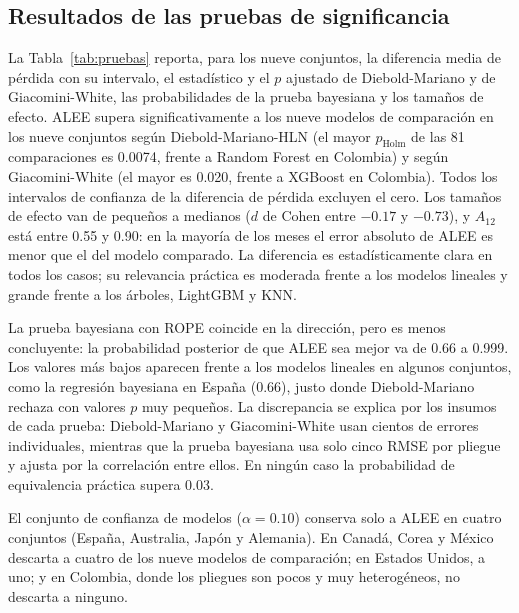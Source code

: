 \documentclass[11pt]{article}
\begin{document}
\FloatBarrier
\subsection{Resultados de las pruebas de significancia}

La Tabla~\ref{tab:pruebas} reporta, para los nueve conjuntos, la diferencia media de pérdida con su intervalo, el estadístico y el $p$ ajustado de Diebold-Mariano y de Giacomini-White, las probabilidades de la prueba bayesiana y los tamaños de efecto. ALEE supera significativamente a los nueve modelos de comparación en los nueve conjuntos según Diebold-Mariano-HLN (el mayor $p_{\mathrm{Holm}}$ de las 81 comparaciones es 0.0074, frente a Random Forest en Colombia) y según Giacomini-White (el mayor es 0.020, frente a XGBoost en Colombia). Todos los intervalos de confianza de la diferencia de pérdida excluyen el cero. Los tamaños de efecto van de pequeños a medianos ($d$ de Cohen entre $-0.17$ y $-0.73$), y $A_{12}$ está entre 0.55 y 0.90: en la mayoría de los meses el error absoluto de ALEE es menor que el del modelo comparado. La diferencia es estadísticamente clara en todos los casos; su relevancia práctica es moderada frente a los modelos lineales y grande frente a los árboles, LightGBM y KNN.

{\tiny\setlength{\tabcolsep}{2pt}

}

La prueba bayesiana con ROPE coincide en la dirección, pero es menos concluyente: la probabilidad posterior de que ALEE sea mejor va de 0.66 a 0.999. Los valores más bajos aparecen frente a los modelos lineales en algunos conjuntos, como la regresión bayesiana en España (0.66), justo donde Diebold-Mariano rechaza con valores $p$ muy pequeños. La discrepancia se explica por los insumos de cada prueba: Diebold-Mariano y Giacomini-White usan cientos de errores individuales, mientras que la prueba bayesiana usa solo cinco RMSE por pliegue y ajusta por la correlación entre ellos. En ningún caso la probabilidad de equivalencia práctica supera 0.03.

El conjunto de confianza de modelos ($\alpha=0.10$) conserva solo a ALEE en cuatro conjuntos (España, Australia, Japón y Alemania). En Canadá, Corea y México descarta a cuatro de los nueve modelos de comparación; en Estados Unidos, a uno; y en Colombia, donde los pliegues son pocos y muy heterogéneos, no descarta a ninguno.
\end{document}
